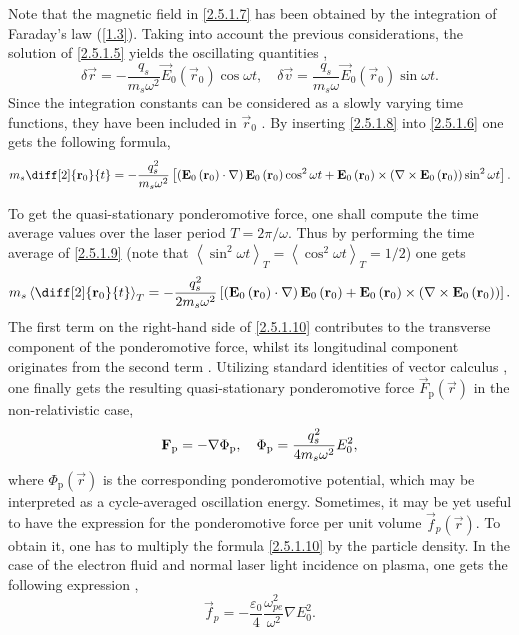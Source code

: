 Note that the magnetic field in \ref{2.5.1.7} has been obtained by the integration of Faraday's law (\ref{1.3}). Taking into account the previous considerations, the solution of \ref{2.5.1.5} yields the oscillating quantities \cite{eliezer},
\begin{equation}
\label{2.5.1.8}
\delta \vec{r} = -\frac{q_s}{m_s \omega^2} \vec{E}_0 \left(\vec{r}_0 \right) \cos \omega t, \quad \delta \vec{v} = \frac{q_s}{m_s \omega} \vec{E}_0 \left(\vec{r}_0 \right) \sin \omega t.
\end{equation}
Since the integration constants can be considered as a slowly varying time functions, they have been included in $ \vec{r}_0 $ \cite{Schmidt1966}. By inserting \ref{2.5.1.8} into \ref{2.5.1.6} one gets the following formula,
\begin{equation}
\label{2.5.1.9}
m_s \diff[2]{\vec{r}_0}{t} = - \frac{q_s^{2}}{m_s \omega^2} \left[\left(\vec{E}_0 \left(\vec{r}_0 \right) \cdot \nabla \right) \vec{E}_0 \left(\vec{r}_0 \right) \cos^2 \omega t + \vec{E}_0 \left(\vec{r}_0 \right) \times \left( \nabla \times \vec{E}_0 \left(\vec{r}_0 \right) \right) \sin^2 \omega t \right].
\end{equation}

To get the quasi-stationary ponderomotive force, one shall compute the time average values over the laser period $ T = 2 \pi/ \omega $. Thus by performing the time average of \ref{2.5.1.9} (note that $ \left\langle \sin^2 \omega t \right\rangle_T = \left\langle \cos^2 \omega t \right\rangle_T = 1/2$) one gets
\begin{equation}
\label{2.5.1.10}
m_s \left\langle \diff[2]{\vec{r}_0}{t} \right\rangle_{T} = - \frac{q_s^{2}}{2 m_s \omega^2} \left[\left(\vec{E}_0 \left(\vec{r}_0 \right) \cdot \nabla \right) \vec{E}_0 \left(\vec{r}_0 \right) + \vec{E}_0 \left(\vec{r}_0 \right) \times \left( \nabla \times \vec{E}_0 \left(\vec{r}_0 \right) \right)\right].
\end{equation}
The first term on the right-hand side of \ref{2.5.1.10} contributes to the transverse component of the ponderomotive force, whilst its longitudinal component originates from the second term \cite{eliezer}. Utilizing standard identities of vector calculus \cite{huba}, one finally gets the resulting quasi-stationary ponderomotive force $ \vec{F}_{\mathrm{p}} \left( \vec{r} \right) $ in the non-relativistic case,
\begin{equation}
\label{2.5.1.11}
\mathbf{F}_{\mathrm{p}} = - \nabla \Phi_{\mathrm{p}}, \quad \Phi_{\mathrm{p}} = \frac{q_s^{2}}{4 m_s \omega^2} E_0^{2},
\end{equation}
where $ \Phi_{\mathrm{p}} \left( \vec{r} \right) $ is the corresponding ponderomotive potential, which may be interpreted as a cycle-averaged oscillation energy. Sometimes, it may be yet useful to have the expression for the ponderomotive force per unit volume $ \vec{f}_{p} \left( \vec{r} \right) $. To obtain it, one has to multiply the formula \ref{2.5.1.10} by the particle density. In the case of the electron fluid and normal laser light incidence on plasma, one gets the following expression \cite{pfalzner},
\begin{equation}
\vec{f}_{p} = - \frac{\varepsilon_0}{4} \frac{\omega_{pe}^{2}}{\omega^{2}} \nabla E_0^{2}.
\end{equation}